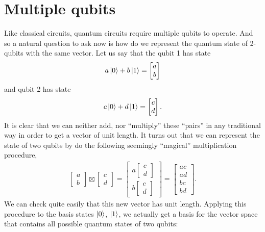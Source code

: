 \documentclass[a4paper,11pt]{article}
\numberwithin{equation}{section}
\theoremstyle{definition}
\begin{document}
\section{Multiple qubits}
Like classical circuits, quantum circuits require multiple qubits to operate. And so a natural question to ask now is how do we represent the quantum state of 2-qubits with the same vector. Let us say that the qubit 1 has state $$a\left\vert{0}\right\rangle + b\left\vert{1}\right\rangle = \begin{bmatrix}
a\\b
\end{bmatrix}$$ and qubit 2 has state $$c\left\vert{0}\right\rangle + d\left\vert{1}\right\rangle = \begin{bmatrix}
c\\d
\end{bmatrix}.$$ It is clear that we can neither add, nor ``multiply'' these ``pairs'' in any traditional way in order to get a vector of unit length. It turns out that we can represent the state of two qubits by do the following seemingly ``magical'' multiplication procedure,
\begin{align*}
\begin{bmatrix}
a\\b
\end{bmatrix}
\boxtimes
\begin{bmatrix}
c\\d
\end{bmatrix} = \begin{bmatrix}
a\begin{bmatrix}
c\\d
\end{bmatrix}\\
b\begin{bmatrix}
c\\d
\end{bmatrix}
\end{bmatrix}
=
\begin{bmatrix}
ac\\ad\\bc\\bd
\end{bmatrix}.
\end{align*}
We can check quite easily that this new vector has unit length. Applying this procedure to the basis states $\left\vert{0}\right\rangle$, $\left\vert{1}\right\rangle$, we actually get a basis for the vector space that contains all possible quantum states of two qubits:
\end{document}
